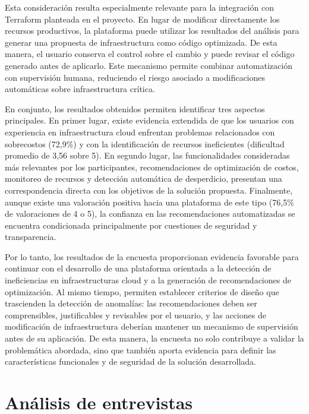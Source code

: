 Esta consideración resulta especialmente relevante para la integración con Terraform planteada en el proyecto. En lugar de modificar directamente los recursos productivos, la plataforma puede utilizar los resultados del análisis para generar una propuesta de infraestructura como código optimizada. De esta manera, el usuario conserva el control sobre el cambio y puede revisar el código generado antes de aplicarlo. Este mecanismo permite combinar automatización con supervisión humana, reduciendo el riesgo asociado a modificaciones automáticas sobre infraestructura crítica.

En conjunto, los resultados obtenidos permiten identificar tres aspectos principales. En primer lugar, existe evidencia extendida de que los usuarios con experiencia en infraestructura cloud enfrentan problemas relacionados con sobrecostos (72,9\%) y con la identificación de recursos ineficientes (dificultad promedio de 3,56 sobre 5). En segundo lugar, las funcionalidades consideradas más relevantes por los participantes, recomendaciones de optimización de costos, monitoreo de recursos y detección automática de desperdicio, presentan una correspondencia directa con los objetivos de la solución propuesta. Finalmente, aunque existe una valoración positiva hacia una plataforma de este tipo (76,5\% de valoraciones de 4 o 5), la confianza en las recomendaciones automatizadas se encuentra condicionada principalmente por cuestiones de seguridad y transparencia.

Por lo tanto, los resultados de la encuesta proporcionan evidencia favorable para continuar con el desarrollo de una plataforma orientada a la detección de ineficiencias en infraestructuras cloud y a la generación de recomendaciones de optimización. Al mismo tiempo, permiten establecer criterios de diseño que trascienden la detección de anomalías: las recomendaciones deben ser comprensibles, justificables y revisables por el usuario, y las acciones de modificación de infraestructura deberían mantener un mecanismo de supervisión antes de su aplicación. De esta manera, la encuesta no solo contribuye a validar la problemática abordada, sino que también aporta evidencia para definir las características funcionales y de seguridad de la solución desarrollada.

\section{Análisis de entrevistas}

